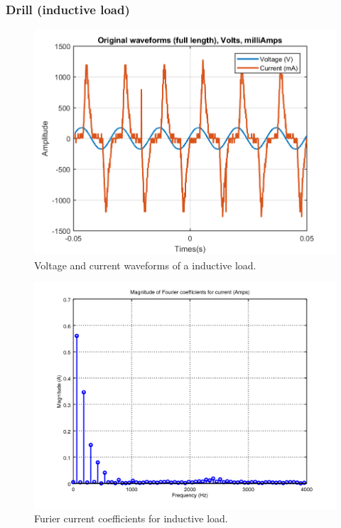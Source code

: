 \documentclass[journal]{IEEEtran}
\begin{document}
\subsubsection{Drill (inductive load)}

\begin{figure}[h]
\centering
\includegraphics[clip,width=\columnwidth]{original_waveform_drill.png}
\caption{Voltage and current waveforms of a inductive load.}
\label{original_inductive_load}
\end{figure}

\begin{figure}[h]
\centering
\includegraphics[clip,width=\columnwidth]{zoomed_current_furier_coefficients_drill.png}
\caption{Furier current coefficients for inductive load.}
\label{fourier_corrent_coefficients_inductive}
\end{figure}
\end{document}
